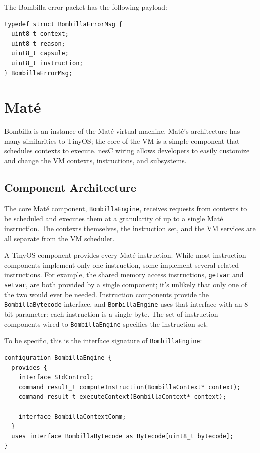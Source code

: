 \documentclass[10pt]{article}
\newcommand{\mate}{Mat\'{e}\xspace}
\newcommand{\bomb}{Bombilla\xspace}
\begin{document}
The \bomb error packet has the following payload:


\begin{verbatim}
typedef struct BombillaErrorMsg {
  uint8_t context;
  uint8_t reason;
  uint8_t capsule;
  uint8_t instruction;
} BombillaErrorMsg;
\end{verbatim}

\section{\mate}

\bomb is an instance of the \mate virtual machine. \mate's architecture
has many similarities to TinyOS; the core of the VM is a simple
component that schedules contexts to execute. nesC wiring allows
developers to easily customize and change the VM contexts,
instructions, and subsystems.

\subsection{Component Architecture}

The core \mate component, {\tt BombillaEngine}, receives requests from
contexts to be scheduled and executes them at a granularity of up to a
single \mate instruction. The contexts themselves, the instruction
set, and the VM services are all separate from the VM scheduler.

A TinyOS component provides every \mate instruction. While most
instruction components implement only one instruction, some implement
several related instructions. For example, the shared memory access
instructions, {\tt getvar} and {\tt setvar}, are both provided by a
single component; it's unlikely that only one of the two would ever be
needed. Instruction components provide the {\tt BombillaBytecode}
interface, and {\tt BombillaEngine} uses that interface with an 8-bit
parameter: each instruction is a single byte. The set of instruction
components wired to {\tt BombillaEngine} specifies the instruction
set.

To be specific, this is the interface signature of {\tt BombillaEngine}:

\begin{verbatim}
configuration BombillaEngine {
  provides {
    interface StdControl;
    command result_t computeInstruction(BombillaContext* context);
    command result_t executeContext(BombillaContext* context);
    
    interface BombillaContextComm;
  }
  uses interface BombillaBytecode as Bytecode[uint8_t bytecode];
}
\end{verbatim}
\end{document}
